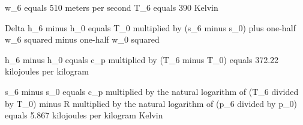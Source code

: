 w_6 equals 510 meters per second  
T_6 equals 390 Kelvin  

Delta h_6 minus h_0 equals T_0 multiplied by (s_6 minus s_0) plus one-half w_6 squared minus one-half w_0 squared  

h_6 minus h_0 equals c_p multiplied by (T_6 minus T_0) equals 372.22 kilojoules per kilogram  

s_6 minus s_0 equals c_p multiplied by the natural logarithm of (T_6 divided by T_0) minus R multiplied by the natural logarithm of (p_6 divided by p_0) equals 5.867 kilojoules per kilogram Kelvin